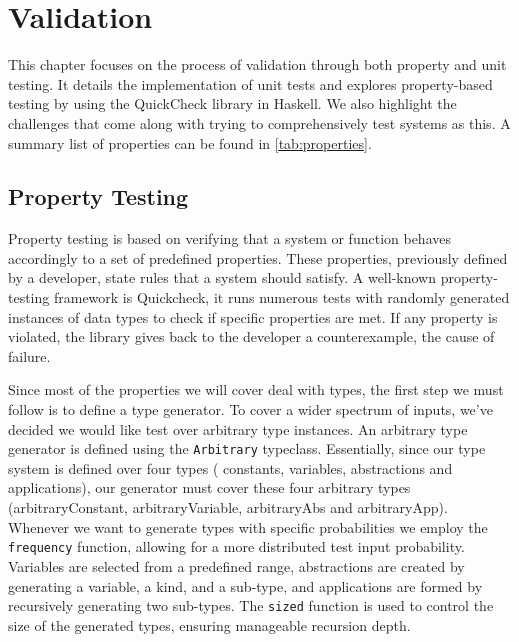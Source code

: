 \chapter{Validation}

This chapter focuses on the process of validation through both property and unit testing. It details the implementation of unit tests and explores property-based testing by using the QuickCheck library in Haskell. We also highlight the challenges that come along with trying to comprehensively test systems as this. A summary list of properties can be found in \cref*{tab:properties}.




\section{Property Testing}

Property testing is based on verifying that a system or function behaves accordingly to a set of predefined properties. These properties, previously defined by a developer, state rules that a system should satisfy. A well-known property-testing framework is Quickcheck, it runs numerous tests with randomly generated instances of data types to check if specific properties are met. If any property is violated, the library gives back to the developer a counterexample, the cause of failure.

Since most of the properties we will cover deal with types, the first step we must follow is to define a type generator. To cover a wider spectrum of inputs, we've decided we would like test over arbitrary type instances. An arbitrary type generator is defined using the \lstinline{Arbitrary} typeclass. Essentially, since our type system is defined over four types ( constants, variables, abstractions and applications), our generator must cover these four arbitrary types (arbitraryConstant, arbitraryVariable, arbitraryAbs and arbitraryApp). Whenever we want to generate types with specific probabilities we employ the \lstinline{frequency} function, allowing for a more distributed test input probability. Variables are selected from a predefined range, abstractions are created by generating a variable, a kind, and a sub-type, and applications are formed by recursively generating two sub-types. The \lstinline{sized} function is used to control the size of the generated types, ensuring manageable recursion depth. 

